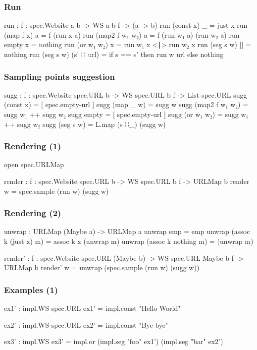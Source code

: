 \documentclass[aspectratio=169]{beamer}
\begin{document}
\begin{frame}
\frametitle{Run}
\begin{code}
  run : {f : spec.Website a b} -> WS {a} {b} {f} -> (a -> b)
  run (const x) _ = just x
  run (map f x) a = f (run x a)
  run (map2 f w₁ w₂) a = f (run w₁ a) (run w₂ a)
  run empty x = nothing
  run (or w₁ w₂) x = run w₁ x <∣> run w₂ x
  run (seg s w) [] = nothing
  run (seg s w) (s' ∷ url) = if s == s' then run w url else nothing
\end{code}
\end{frame}

\begin{frame}
\frametitle{Sampling points suggestion}
\begin{code}
  sugg : {f : spec.Website spec.URL b}
         -> WS {spec.URL} {b} {f}
         -> List spec.URL
  sugg (const x) = [ spec.empty-url ]
  sugg (map _ w) = sugg w
  sugg (map2 f w₁ w₂) = sugg w₁ ++ sugg w₂
  sugg empty = [ spec.empty-url ]
  sugg (or w₁ w₂) = sugg w₁ ++ sugg w₂
  sugg (seg s w) = L.map (s ∷_) (sugg w)
\end{code}
\end{frame}

\begin{frame}
\frametitle{Rendering (1)}
\begin{code}
  open spec.URLMap

  render : {f : spec.Website spec.URL b}
           -> WS {spec.URL} {b} {f}
           -> URLMap b
  render w = spec.sample (run w) (sugg w)
\end{code}
\end{frame}

\begin{frame}
\frametitle{Rendering (2)}
\begin{code}
  unwrap : URLMap (Maybe a) -> URLMap a
  unwrap emp = emp
  unwrap (assoc k (just x) m) = assoc k x (unwrap m)
  unwrap (assoc k nothing m) = (unwrap m)

  render' : {f : spec.Website spec.URL (Maybe b)}
            -> WS {spec.URL} {Maybe b} {f}
            -> URLMap b
  render' w = unwrap (spec.sample (run w) (sugg w))
\end{code}
\end{frame}

\begin{frame}
\frametitle{Examples (1)}
\begin{code}
ex1' : impl.WS {spec.URL}
ex1' = impl.const "Hello World"

ex2' : impl.WS {spec.URL}
ex2' = impl.const "Bye bye"

ex3' : impl.WS
ex3' = impl.or (impl.seg "foo" ex1')
               (impl.seg "bar" ex2')
\end{code}
\end{frame}
\end{document}

